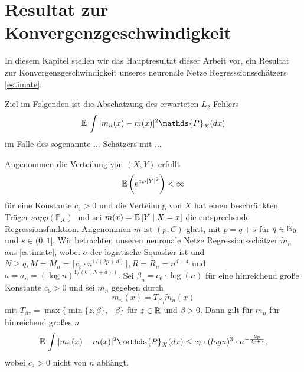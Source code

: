 \chapter{Resultat zur Konvergenzgeschwindigkeit}
\label{chap:3}

In diesem Kapitel stellen wir das Hauptresultat dieser Arbeit vor, ein Resultat zur Konvergenzgeschwindigkeit unseres neuronale Netze Regresssionsschätzers \ref{estimate}.

Ziel im Folgenden ist die Abschätzung des erwarteten $L_2$-Fehlers 
$$\E \int |m_n(x) - m(x)|^2  \mathds{P}_X(dx)$$
im Falle des sogenannte ... Schätzers mit ... 

\begin{thm}\label{optstop}
Angenommen die Verteilung von $(X,Y)$ erfüllt 
$$ \mathbb{E}\,\bigg(\mathrm{e}^{c_4 \cdot |Y|^2}\bigg) < \infty$$
für eine Konstante $c_4 > 0$ und die Verteilung von $X$ hat einen beschränkten Träger $supp(\mathds{P}_X)$ und sei $m(x) = \mathbb{E}\,[Y \mid X = x]$ die entsprechende Regressionsfunktion. 
Angenommen $m$ ist $(p,C)$-glatt, mit $p = q + s$ für $q \in \mathbb{N}_0$ und $s \in (0,1].$ Wir betrachten unseren neuronale Netze Regressionsschätzer $\tilde{m}_n$ aus \ref{estimate}, wobei $\sigma$ der logistische Squasher ist und $N \geq q, M = M_n = \lceil c_5 \cdot n^{1/(2p + d)}\rceil, R = R_n = n^{d + 4}$ und $a = a_n = (\log n)^{1/(6(N + d))}.$
Sei $\beta_n = c_6 \cdot \log(n)$ für eine hinreichend große Konstante $c_6 > 0$ und sei $m_n$ gegeben durch
$$m_n(x) = T_{\beta_n}\tilde{m}_n (x)$$
mit $T_{\beta z} = \max\{\min\{z, \beta\}, -\beta\}$ für $z \in \mathbb{R}$ und $\beta > 0.$ Dann gilt für $m_n$ für hinreichend großes $n$
$$\E \int |m_n(x) - m(x)|^2  \mathds{P}_X(dx) \leq c_7 \cdot (log n)^3 \cdot n^{- \frac{2p}{2p + d}},$$
wobei $c_7 > 0$ nicht von $n$ abhängt.
\end{thm}
